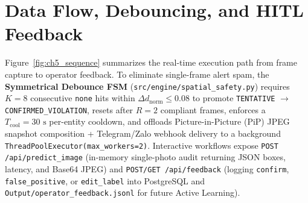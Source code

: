 \section{Data Flow, Debouncing, and HITL Feedback}

Figure~\ref{fig:ch5_sequence} summarizes the real-time execution path from frame capture to operator feedback. To eliminate single-frame alert spam, the \textbf{Symmetrical Debounce FSM} (\nolinkurl{src/engine/spatial_safety.py}) requires $K = 8$ consecutive \texttt{none} hits within $\Delta d_{\text{norm}} \le 0.08$ to promote \texttt{TENTATIVE} $\to$ \nolinkurl{CONFIRMED_VIOLATION}, resets after $R = 2$ compliant frames, enforces a $T_{\text{cool}} = 30\text{ s}$ per-entity cooldown, and offloads Picture-in-Picture (PiP) JPEG snapshot composition + Telegram/Zalo webhook delivery to a background \nolinkurl{ThreadPoolExecutor(max_workers=2)}. Interactive workflows expose \nolinkurl{POST /api/predict_image} (in-memory single-photo audit returning JSON boxes, latency, and Base64 JPEG) and \nolinkurl{POST/GET /api/feedback} (logging \texttt{confirm}, \texttt{false\_positive}, or \texttt{edit\_label} into PostgreSQL and \nolinkurl{Output/operator_feedback.jsonl} for future Active Learning).

